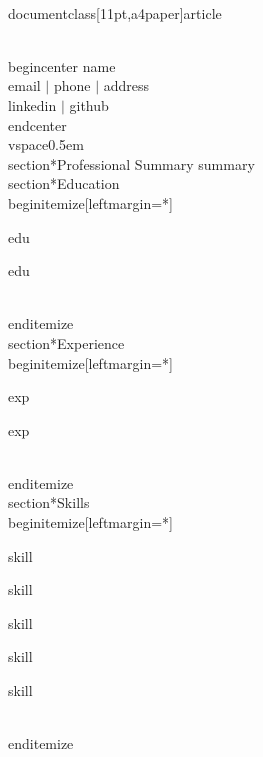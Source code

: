 \\documentclass[11pt,a4paper]{article}
\begin{document}
\\begin{center}
    {name} \\
    {email} $|$ {phone} $|$ {address} \\
    {linkedin} $|$ {github}
\\end{center}
\\vspace{0.5em}
\\section*{Professional Summary}
{summary}
\\section*{Education}
\\begin{itemize}[leftmargin=*]
  
    \item {edu}
  
    \item {edu}

\\end{itemize}
\\section*{Experience}
\\begin{itemize}[leftmargin=*]
  
    \item {exp}
  
    \item {exp}

\\end{itemize}
\\section*{Skills}
\\begin{itemize}[leftmargin=*]
  
    \item {skill}
  
    \item {skill}
  
    \item {skill}
  
    \item {skill}
  
    \item {skill}

\\end{itemize}
\
\end{document}
